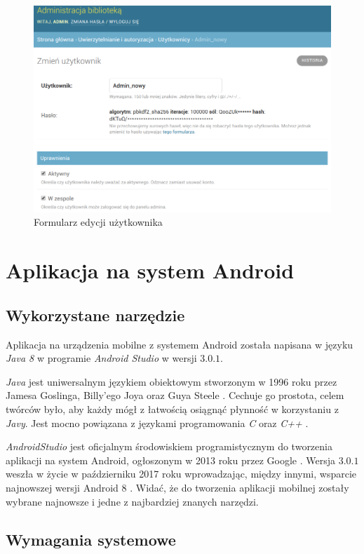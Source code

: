 \documentclass[twoside]{projektInzynierskiMS}
\begin{document}
\begin{figure}[h]
  \centering
  \includegraphics[width=0.6\linewidth]{img/backend/Uprawnienia.png}
  \caption{Formularz edycji użytkownika}
  \label{fig:editUser}
\end{figure}

\section{Aplikacja na system Android}

\subsection{Wykorzystane narzędzie}

Aplikacja na urządzenia mobilne z systemem Android została napisana w języku \textit{Java 8} w programie \textit{Android Studio} w wersji $3.0.1$.

\textit{Java} jest uniwersalnym językiem obiektowym stworzonym w 1996 roku przez Jamesa Goslinga, Billy'ego Joya oraz Guya Steele \cite{javaOracle}. Cechuje go prostota, celem twórców było, aby każdy mógł z łatwością osiągnąć płynność w korzystaniu z \textit{Javy}. Jest mocno powiązana z językami programowania \textit{C} oraz \textit{C++} \cite{javaOracle}. 

\textit{AndroidStudio} jest oficjalnym środowiskiem programistycznym do tworzenia aplikacji na system Android, ogłoszonym w 2013 roku przez Google \cite{PPPAndroida}. Wersja $3.0.1$ weszła w życie w październiku 2017 roku wprowadzając, między innymi, wsparcie najnowszej wersji Android $8$ \cite{androidStudioDev}. Widać, że do tworzenia aplikacji mobilnej zostały wybrane najnowsze i jedne z najbardziej znanych narzędzi.
 
\subsection{Wymagania systemowe}
\end{document}
